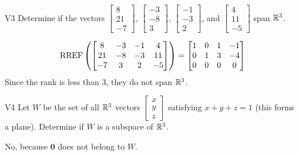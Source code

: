 \documentclass{sbgLAsemi}
\begin{document}
\begin{problem}{V3}
Determine if the vectors  $\begin{bmatrix} 8 \\ 21 \\ -7 \end{bmatrix}$, $\begin{bmatrix} -3 \\ -8 \\ 3 \end{bmatrix}$, $\begin{bmatrix} -1 \\ -3 \\ 2 \end{bmatrix}$, and $\begin{bmatrix} 4 \\ 11 \\ -5 \end{bmatrix}$ span $\mathbb{R}^3$.
\end{problem}
\begin{solution}
$$\operatorname{RREF}\left(\begin{bmatrix} 8 & -3 & -1 & 4 \\ 21 & -8 & -3 & 11 \\ -7 & 3 & 2 & -5  \end{bmatrix} \right) = \begin{bmatrix} 1 & 0 & 1 & -1 \\ 0 & 1 & 3 & -4 \\ 0 & 0 & 0 & 0\end{bmatrix} $$
Since the rank is less than 3, they do not span $\mathbb{R}^3$.
\end{solution}

\begin{problem}{V4} Let \(W\) be the set of all \(\mathbb{R}^3\) vectors
\(\begin{bmatrix} x \\ y \\ z \end{bmatrix}\)
satisfying \(x+y+z=1\) (this forms a plane).
Determine if \(W\) is a subspace of \(\mathbb{R}^3\).
\end{problem}
\begin{solution}
No, because \(\mathbf{0}\) does not belong to \(W\).
\end{solution}
\end{document}
